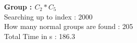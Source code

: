 \textbf{Group : $C_2*C_5$}\\
Searching up to index : 2000\\
How many normal groups are found : 205\\
Total Time in s : 186.3\\
